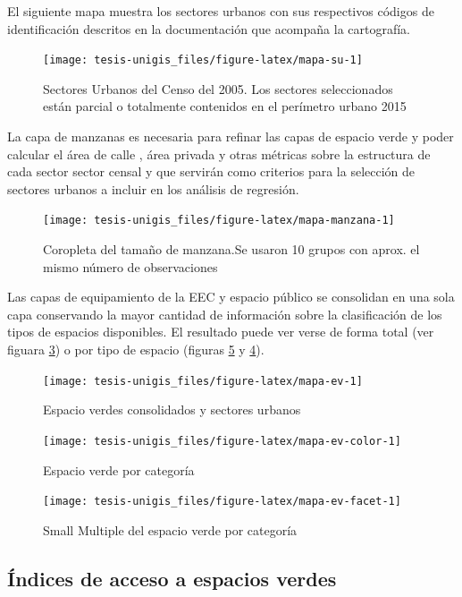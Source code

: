 \documentclass[12pt,]{book}
\begin{document}
El siguiente mapa muestra los sectores urbanos con sus respectivos
códigos de identificación descritos en la documentación que acompaña la
cartografía.

\begin{figure}
\texttt{[image: tesis-unigis\_files/figure-latex/mapa-su-1]} \caption{Sectores Urbanos del Censo del 2005. Los sectores seleccionados están parcial o totalmente contenidos en el perímetro urbano 2015}\label{fig:mapa-su}
\end{figure}

La capa de manzanas es necesaria para refinar las capas de espacio verde
y poder calcular el área de calle , área privada y otras métricas sobre
la estructura de cada sector sector censal y que servirán como criterios
para la selección de sectores urbanos a incluir en los análisis de
regresión.

\begin{figure}
\texttt{[image: tesis-unigis\_files/figure-latex/mapa-manzana-1]} \caption{Coropleta del tamaño de manzana.Se usaron 10 grupos con aprox. el mismo número de observaciones}\label{fig:mapa-manzana}
\end{figure}

Las capas de equipamiento de la EEC y espacio público se consolidan en
una sola capa conservando la mayor cantidad de información sobre la
clasificación de los tipos de espacios disponibles. El resultado puede
ver verse de forma total (ver figuara \ref{fig:mapa-ev}) o por tipo de
espacio (figuras \ref{fig:mapa-ev-facet} y \ref{fig:mapa-ev-color}).

\begin{figure}
\texttt{[image: tesis-unigis\_files/figure-latex/mapa-ev-1]} \caption{Espacio verdes consolidados y sectores urbanos}\label{fig:mapa-ev}
\end{figure}

\begin{figure}
\texttt{[image: tesis-unigis\_files/figure-latex/mapa-ev-color-1]} \caption{Espacio verde por categoría}\label{fig:mapa-ev-color}
\end{figure}

\begin{figure}
\texttt{[image: tesis-unigis\_files/figure-latex/mapa-ev-facet-1]} \caption{Small Multiple del espacio verde por categoría}\label{fig:mapa-ev-facet}
\end{figure}

\subsection{Índices de acceso a espacios
verdes}\label{indices-de-acceso-a-espacios-verdes}
\end{document}
